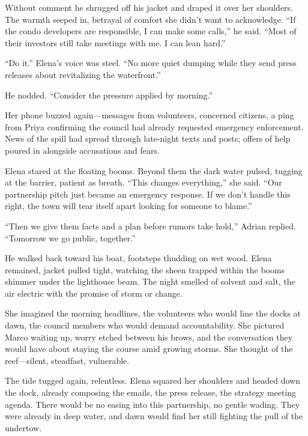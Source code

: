 Without comment he shrugged off his jacket and draped it over her shoulders. The warmth seeped in, betrayal of comfort she didn’t want to acknowledge. “If the condo developers are responsible, I can make some calls,” he said. “Most of their investors still take meetings with me. I can lean hard.”

“Do it.” Elena’s voice was steel. “No more quiet dumping while they send press releases about revitalizing the waterfront.”

He nodded. “Consider the pressure applied by morning.”

Her phone buzzed again—messages from volunteers, concerned citizens, a ping from Priya confirming the council had already requested emergency enforcement. News of the spill had spread through late-night texts and posts; offers of help poured in alongside accusations and fears.

Elena stared at the floating booms. Beyond them the dark water pulsed, tugging at the barrier, patient as breath. “This changes everything,” she said. “Our partnership pitch just became an emergency response. If we don’t handle this right, the town will tear itself apart looking for someone to blame.”

“Then we give them facts and a plan before rumors take hold,” Adrian replied. “Tomorrow we go public, together.”

He walked back toward his boat, footsteps thudding on wet wood. Elena remained, jacket pulled tight, watching the sheen trapped within the booms shimmer under the lighthouse beam. The night smelled of solvent and salt, the air electric with the promise of storm or change.

She imagined the morning headlines, the volunteers who would line the docks at dawn, the council members who would demand accountability. She pictured Marco waiting up, worry etched between his brows, and the conversation they would have about staying the course amid growing storms. She thought of the reef—silent, steadfast, vulnerable.

The tide tugged again, relentless. Elena squared her shoulders and headed down the dock, already composing the emails, the press release, the strategy meeting agenda. There would be no easing into this partnership, no gentle wading. They were already in deep water, and dawn would find her still fighting the pull of the undertow.
